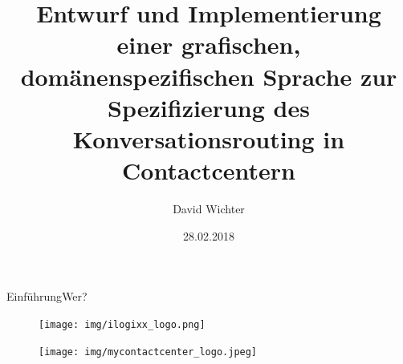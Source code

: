 \documentclass[t,aspectratio=169,divpsnames]{beamer}
\title[Entwurf und Implementierung einer DSL zur Spezifikation von Konversationsrouting]{Entwurf und Implementierung einer grafischen, domänenspezifischen Sprache zur Spezifizierung des Konversationsrouting in Contactcentern}
\author{David Wichter}
\institute{Hochschule Trier}
\date{28.02.2018}
\begin{document}
\begin{frame}
\titlepage
\end{frame}


\begin{frame}{Einführung}{Wer?}
	\only<1->
	{
		\begin{figure}
			\texttt{[image: img/ilogixx\_logo.png]}
		\end{figure}
	}
	{
		\begin{figure}
			\texttt{[image: img/mycontactcenter\_logo.jpeg]}
		\end{figure}
	}
\end{frame}
\end{document}
